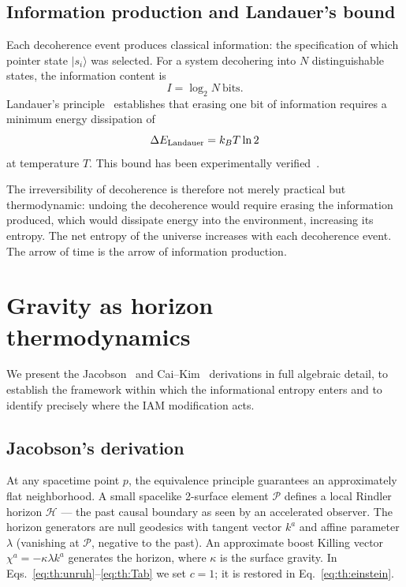 \subsection{Information production and Landauer's bound}
Each decoherence event produces classical information: the specification of which pointer state $|s_i\rangle$ was selected. For a system decohering
into $N$ distinguishable states, the information content is
\begin{equation}I=\log_2N\ \text{bits}.\end{equation}
Landauer's principle~\cite{Landauer1961} establishes that erasing one bit of information requires a minimum energy dissipation of
\begin{equation}\Delta E_{\rm Landauer}=k_BT\ln2\label{eq:th:landauer}\end{equation}
at temperature $T$. This bound has been experimentally verified~\cite{Berut2012,Jun2014}. \observed

The irreversibility of decoherence is therefore not merely practical but thermodynamic: undoing the decoherence would require erasing the information
produced, which would dissipate energy into the environment, increasing its entropy. The net entropy of the universe increases with each decoherence
event. The arrow of time is the arrow of information production. \interp

\section{Gravity as horizon thermodynamics}\label{sec:th:gravity}
We present the Jacobson~\cite{Jacobson1995} and Cai--Kim~\cite{CaiKim2005} derivations in full algebraic detail, to establish the framework within which the informational
entropy enters and to identify precisely where the IAM modification acts.

\subsection{Jacobson's derivation}\label{sec:th:jacobson}
At any spacetime point $p$, the equivalence principle guarantees an approximately flat neighborhood. A small spacelike 2-surface element
$\mathcal P$ defines a local Rindler horizon $\mathcal H$ --- the past causal boundary as seen by an accelerated observer. The horizon generators are
null geodesics with tangent vector $k^a$ and affine parameter $\lambda$ (vanishing at $\mathcal P$, negative to the past). An approximate boost Killing
vector $\chi^a=-\kappa\lambda k^a$ generates the horizon, where $\kappa$ is the surface gravity. In Eqs.~\eqref{eq:th:unruh}--\eqref{eq:th:Tab} we set $c=1$;
it is restored in Eq.~\eqref{eq:th:einstein}. \derived

